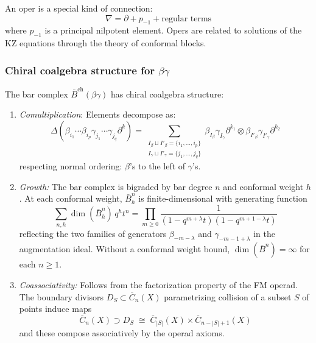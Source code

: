 \begin{remark}
An oper is a special kind of connection:
\[
\nabla = \partial + p_{-1} + \text{regular terms}
\]
where $p_{-1}$ is a principal nilpotent element.  Opers are related to solutions of the KZ equations through the theory of conformal blocks.
\end{remark}

\subsubsection{\texorpdfstring{Chiral coalgebra structure for $\beta\gamma$}{Chiral coalgebra structure for beta-gamma}}

\begin{conjecture}\label{conj:bg-bar-coalg}
The bar complex $\bar{B}^{\text{ch}}(\beta\gamma)$ has chiral coalgebra structure:
\begin{enumerate}
\item \emph{Comultiplication}: Elements decompose as:
\[
\Delta(\beta_{i_1} \cdots \beta_{i_p} \gamma_{j_1} \cdots \gamma_{j_q} \partial^k) = 
\sum_{\substack{I_\beta \sqcup I'_\beta = \{i_1,\ldots,i_p\} \\ I_\gamma \sqcup I'_\gamma = \{j_1,\ldots,j_q\}}} 
\beta_{I_\beta}\gamma_{I_\gamma}\partial^{k_1} \otimes \beta_{I'_\beta}\gamma_{I'_\gamma}\partial^{k_2}
\]
respecting normal ordering: $\beta$'s to the left of $\gamma$'s.

\item \emph{Growth:} The bar complex is bigraded by bar degree $n$ and conformal weight $h$.  At each conformal weight, $\bar{B}^n_h$ is finite-dimensional with generating function
\[\sum_{n,h} \dim(\bar{B}^n_h)\, q^h t^n = \prod_{m \geq 0} \frac{1}{(1-q^{m+\lambda}t)(1-q^{m+1-\lambda}t)}\]
reflecting the two families of generators $\beta_{-m-\lambda}$ and $\gamma_{-m-1+\lambda}$ in the augmentation ideal.  Without a conformal weight bound, $\dim(\bar{B}^n) = \infty$ for each $n \geq 1$.

\item \emph{Coassociativity:} Follows from the factorization property of the FM operad.  The boundary divisors $D_S \subset \overline{C}_{n}(X)$ parametrizing collision of a subset $S$ of points induce maps
\[
\overline{C}_{n}(X) \supset D_S \;\cong\; \overline{C}_{|S|}(X) \times \overline{C}_{n-|S|+1}(X)
\]
and these compose associatively by the operad axioms.
\end{enumerate}
\end{conjecture}

